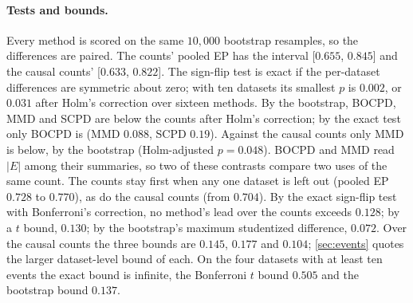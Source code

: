 \documentclass[11pt]{article}
\theoremstyle{dsplain}
\theoremstyle{definition}
\begin{document}
\paragraph{Tests and bounds.} Every method is scored on the same $10{,}000$ bootstrap resamples, so the
differences are paired. The counts' pooled EP has the interval [$0.655$, $0.845$] and the causal counts'
[$0.633$, $0.822$]. The sign-flip test is exact if the per-dataset differences are symmetric about zero;
with ten datasets its smallest $p$ is $0.002$, or $0.031$ after Holm's correction over sixteen methods. By
the bootstrap, BOCPD, MMD and SCPD are below the counts after Holm's correction; by the exact test only
BOCPD is (MMD $0.088$, SCPD $0.19$). Against the causal counts only MMD is below, by the bootstrap
(Holm-adjusted $p = 0.048$). BOCPD and MMD read $|E|$ among their summaries, so two of these contrasts
compare two uses of the same count. The counts stay first when any one dataset is left out (pooled EP $0.728$ to $0.770$), as
do the causal counts (from $0.704$). By the exact sign-flip test with Bonferroni's correction, no method's
lead over the counts exceeds $0.128$; by a $t$ bound, $0.130$; by the bootstrap's maximum studentized
difference, $0.072$. Over the causal counts the three bounds are $0.145$, $0.177$ and $0.104$;
\cref{sec:events} quotes the larger dataset-level bound of each. On the four datasets with at least ten
events the exact bound is infinite, the Bonferroni $t$ bound $0.505$ and the bootstrap bound $0.137$.
\end{document}
